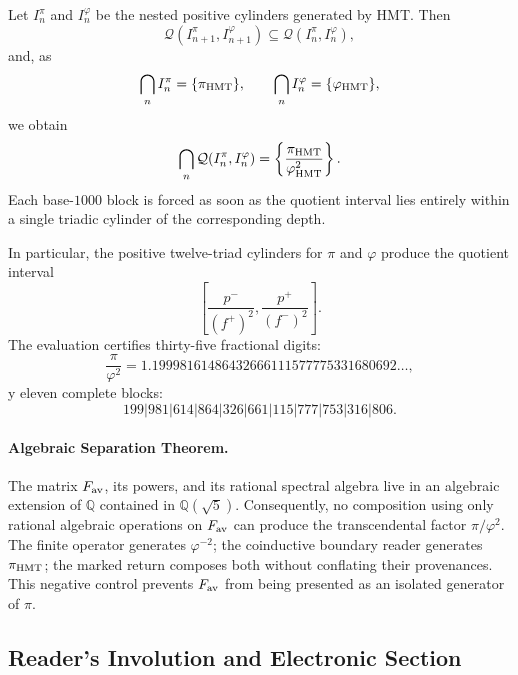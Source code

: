 Let \(I_n^\pi\) and \(I_n^\varphi\) be the nested positive cylinders
generated by HMT\@. Then
\[
 \mathcal Q(I_{n+1}^\pi,I_{n+1}^\varphi)
 \subseteq
 \mathcal Q(I_n^\pi,I_n^\varphi),
\]
and, as
\[
 \bigcap_n I_n^\pi=\{\pi_{\rm HMT}\},
 \qquad
 \bigcap_n I_n^\varphi=\{\varphi_{\rm HMT}\},
\]
we obtain
\[
 \bigcap_n\mathcal Q(I_n^\pi,I_n^\varphi)
 =\left\{\frac{\pi_{\rm HMT}}{\varphi_{\rm HMT}^2}\right\}.
\]
Each base-\(1000\) block is forced as soon as the quotient interval
lies entirely within a single triadic cylinder of the corresponding
depth.

In particular, the positive twelve-triad cylinders for \(\pi\) and
\(\varphi\) produce the quotient interval
\[
 \left[
 \frac{p^-}{(f^+)^2},
 \frac{p^+}{(f^-)^2}
 \right].
\]
The evaluation certifies thirty-five fractional digits:
\[
 \frac{\pi}{\varphi^2}
 =1.19998161486432666111577775331680692\ldots,
\]
y eleven complete blocks:
\[
 199|981|614|864|326|661|115|777|753|316|806.
\]

\paragraph{Algebraic Separation Theorem.}
The matrix \(F_{\rm av}\), its powers, and its rational spectral algebra
live in an algebraic extension of \(\mathbb Q\) contained in
\(\mathbb Q(\sqrt5)\). Consequently, no composition using only
rational algebraic operations on \(F_{\rm av}\) can produce the
transcendental factor \(\pi/\varphi^2\). The finite operator generates
\(\varphi^{-2}\); the coinductive boundary reader generates
\(\pi_{\rm HMT}\); the marked return composes both without conflating their
provenances. This negative control prevents \(F_{\rm av}\) from being presented as an
isolated generator of \(\pi\).

\subsection{Reader's Involution and Electronic Section}
\label{p12-83-c16-s3:sec:espejo-pi-phi-electron}

